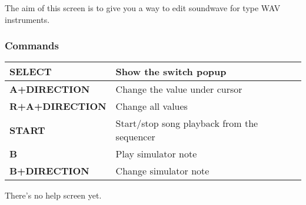 \label{subsec:customwave}

The aim of this screen is to give you a way to edit soundwave for type WAV instruments.



\subsubsection{Commands}
\tablelasttail{\hline}
\begin{supertabular}{|l|p{11cm}|}
    \hline
    {\bf SELECT} & Show the switch popup \\
    \hline
    {\bf A+DIRECTION} & Change the value under cursor \\
    \hline
    {\bf R+A+DIRECTION} & Change all values \\
    \hline
    {\bf START} & Start/stop song playback from the sequencer \\
    \hline
    {\bf B} & Play simulator note \\
    \hline
    {\bf B+DIRECTION} & Change simulator note \\
\end{supertabular} \medskip

There's no help screen yet.
